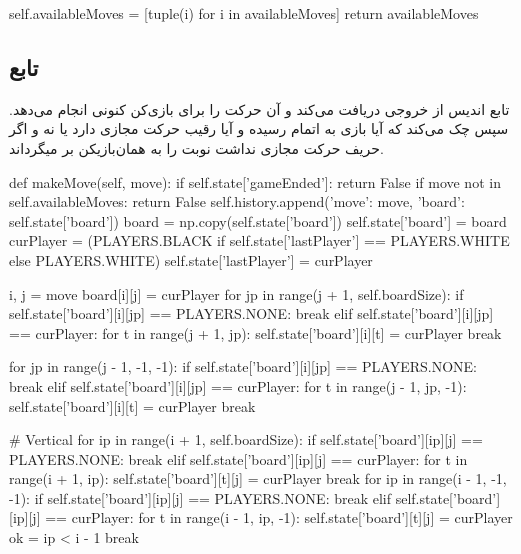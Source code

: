 \begin{latin}
\begin{python}
        self.availableMoves = [tuple(i) for i in availableMoves]
        return availableMoves


\end{python}
\end{latin}

\subsection{تابع }

تابع
اندیس از خروجی
در‌یافت می‌کند و آن حرکت را برای بازی‌کن کنونی انجام می‌دهد.
سپس  چک می‌کند که آیا بازی به اتمام رسیده و آیا رقیب حرکت مجازی دارد یا نه و
اگر حریف حرکت مجازی نداشت نوبت را به  همان‌بازیکن بر ‌میگرداند.

\begin{latin}
\begin{python}
    def makeMove(self, move):
        if self.state['gameEnded']:
            return False
        if move not in self.availableMoves:
            return False
        self.history.append({'move': move, 'board': self.state['board']})
        board = np.copy(self.state['board'])
        self.state['board'] = board
        curPlayer = (PLAYERS.BLACK if 
                self.state['lastPlayer'] == PLAYERS.WHITE else PLAYERS.WHITE)
        self.state['lastPlayer'] = curPlayer

        i, j = move
        board[i][j] = curPlayer
        for jp in range(j + 1, self.boardSize):
            if self.state['board'][i][jp] == PLAYERS.NONE:
                break
            elif self.state['board'][i][jp] == curPlayer:
                for t in range(j + 1, jp):
                    self.state['board'][i][t] = curPlayer
                break

        for jp in range(j - 1, -1, -1):
            if self.state['board'][i][jp] == PLAYERS.NONE:
                break
            elif self.state['board'][i][jp] == curPlayer:
                for t in range(j - 1, jp, -1):
                    self.state['board'][i][t] = curPlayer
                break


        # Vertical
        for ip in range(i + 1, self.boardSize):
            if self.state['board'][ip][j] == PLAYERS.NONE:
                break
            elif self.state['board'][ip][j] == curPlayer:
                for t in range(i + 1, ip):
                    self.state['board'][t][j] = curPlayer
                break
        for ip in range(i - 1, -1, -1):
            if self.state['board'][ip][j] == PLAYERS.NONE:
                break
            elif self.state['board'][ip][j] == curPlayer:
                for t in range(i - 1, ip, -1):
                    self.state['board'][t][j] = curPlayer
                ok = ip < i - 1
                break


\end{python}
\end{latin}
